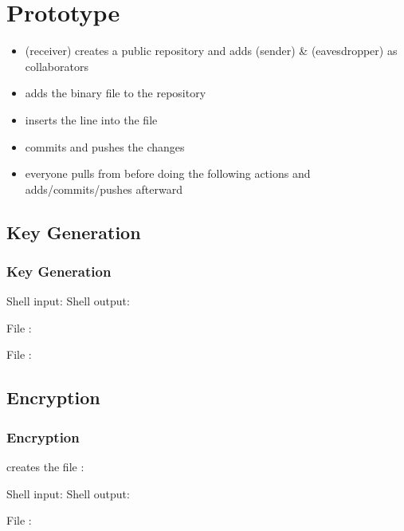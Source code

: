 \section{Prototype}


\begin{frame}
\begin{itemize}
\item \bob{} (receiver)
  creates a public \github{} repository and
  adds \alice{} (sender) \& \eve{} (eavesdropper)
  as collaborators
\item \bob{} adds the binary file \cryout{}
  to the repository
\item \bob{} inserts the line 
  into the file 
\item \bob{} commits and pushes the changes
\item everyone pulls from \github{}
  before doing the following actions
  and adds/commits/pushes afterward
\end{itemize}
\end{frame}


\subsection{Key Generation}

\begin{frame}
\frametitle{Key Generation}

Shell input: \generatekeysindemo
Shell output: \generatekeysoutdemo

File \private{\bobdemo}:
\codestt{}

File \public{\bobdemo}:
\codestt{}


\end{frame}


\subsection{Encryption}

\begin{frame}
\frametitle{Encryption}

\alice{} creates the file \private{\alicedemo}:
\codestt{}

Shell input: \encryptindemo
Shell output: \encryptoutdemo

File \public{\alicedemo}:
\codestt{}


\end{frame}


